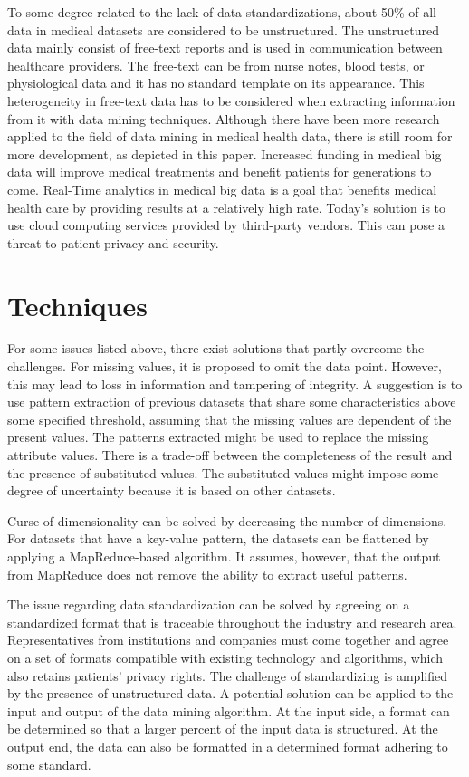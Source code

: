 To some degree related to the lack of data standardizations, about 50\% of all data in medical datasets are considered to be unstructured\cite{wp}. The unstructured data mainly consist of free-text reports and is used in communication between healthcare providers. The free-text can be from nurse notes, blood tests, or physiological data and it has no standard template on its appearance. This heterogeneity in free-text data has to be considered when extracting information from it with data mining techniques. 
 Although there have been more research applied to the field of data mining in medical health data, there is still room for more development, as depicted in this paper. Increased funding in medical big data will improve medical treatments and benefit patients for generations to come. 
Real-Time analytics in medical big data is a goal that benefits medical health care by providing results at a relatively high rate.\cite{kek} Today’s solution is to use cloud computing services provided by third-party vendors. This can pose a threat to patient privacy and security.


\section{Techniques}

For some issues listed above, there exist solutions that partly overcome the challenges. For missing values, it is proposed to omit the data point. However, this may lead to loss in information and tampering of integrity. A suggestion is to use pattern extraction of previous datasets that share some characteristics above some specified threshold, assuming that the missing values are dependent of the present values. The patterns extracted might be used to replace the missing attribute values. There is a trade-off between the completeness of the result and the presence of substituted values. The substituted values might impose some degree of uncertainty because it is based on other datasets. 

Curse of dimensionality can be solved by decreasing the number of dimensions. For datasets that have a key-value pattern, the datasets can be flattened by applying a MapReduce-based algorithm. It assumes, however, that the output from MapReduce does not remove the ability to extract useful patterns.

The issue regarding data standardization can be solved by agreeing on a standardized format that is traceable throughout the industry and research area. Representatives from institutions and companies must come together and agree on a set of formats compatible with existing technology and algorithms, which also retains patients’ privacy rights. The challenge of standardizing is amplified by the presence of unstructured data. A potential solution can be applied to the input and output of the data mining algorithm. At the input side, a format can be determined so that a larger percent of the input data is structured. At the output end, the data can also be formatted in a determined format adhering to some standard.

